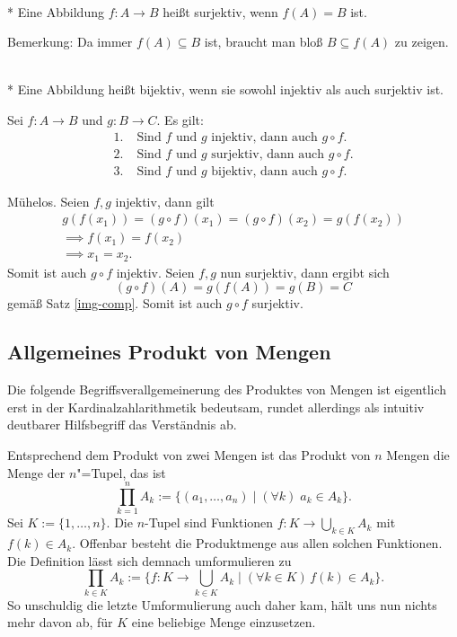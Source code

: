 \begin{Definition}\mbox{}\\*
Eine Abbildung $f\colon A\to B$ heißt surjektiv,
wenn $f(A)=B$ ist.
\end{Definition}
Bemerkung: Da immer $f(A)\subseteq B$ ist, braucht man bloß $B\subseteq f(A)$
zu zeigen.

\begin{Definition}\mbox{}\\*
Eine Abbildung heißt bijektiv, wenn sie sowohl injektiv als
auch surjektiv ist.
\end{Definition}

\begin{Satz}
Sei $f\colon A\to B$ und $g\colon B\to C$. Es gilt:
\begin{align*}
1.\; & \text{Sind $f$ und $g$ injektiv, dann auch $g\circ f$}.\\
2.\; & \text{Sind $f$ und $g$ surjektiv, dann auch $g\circ f$}.\\
3.\; & \text{Sind $f$ und $g$ bijektiv, dann auch $g\circ f$}.
\end{align*}
\end{Satz}
 Mühelos. Seien $f,g$ injektiv, dann gilt
\begin{gather*}
g(f(x_1)) = (g\circ f)(x_1) = (g\circ f)(x_2) = g(f(x_2))\\
\implies f(x_1) = f(x_2)\\
\implies x_1 = x_2.
\end{gather*}
Somit ist auch $g\circ f$ injektiv. Seien $f,g$ nun surjektiv,
dann ergibt sich
\[(g\circ f)(A) = g(f(A)) = g(B) = C\]
gemäß Satz \ref{img-comp}.
Somit ist auch $g\circ f$ surjektiv.\;\qedsymbol

\subsection{Allgemeines Produkt von Mengen}

Die folgende Begriffsverallgemeinerung des Produktes von Mengen
ist eigentlich erst in der Kardinalzahlarithmetik bedeutsam, rundet
allerdings als intuitiv deutbarer Hilfsbegriff das Verständnis ab.

Entsprechend dem Produkt von zwei Mengen ist das Produkt von
$n$ Mengen die Menge der $n$"=Tupel, das ist%
\begin{equation}
\prod_{k=1}^n A_k := \{(a_1,\ldots,a_n)\mid (\forall k)\;a_k\in A_k\}.
\end{equation}
Sei $K:=\{1,\ldots,n\}$. Die $n$-Tupel sind Funktionen
$f\colon K\to \bigcup_{k\in K} A_k$ mit $f(k)\in A_k$. Offenbar besteht
die Produktmenge aus allen solchen Funktionen. Die Definition lässt
sich demnach umformulieren zu
\begin{equation}
\prod_{k\in K} A_k := \{f\colon K\to\bigcup_{k\in K}A_k\mid
(\forall k\in K)\,f(k)\in A_k\}.
\end{equation}
So unschuldig die letzte Umformulierung auch daher kam, hält uns
nun nichts mehr davon ab, für $K$ eine beliebige Menge einzusetzen.

